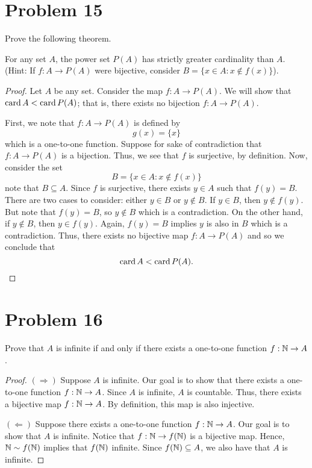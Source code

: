 \documentclass[11pt,a4paper]{article}
\begin{document}
\section*{Problem 15} Prove the following theorem.
\begin{theorem}
    For any set \( A  \), the power set \( P(A) \) has strictly greater cardinality than \( A  \). (Hint: If \( f: A \to P(A) \) were bijective, consider \( B = \{ x \in A : x \notin f(x) \}  \)).
\end{theorem}
\begin{proof}
    Let \( A  \) be any set. Consider the map \( f: A \to P(A) \). We will show that \( \operatorname{card} A < \operatorname{card} P(A) \); that is, there exists no bijection \( f: A \to P(A) \). 

    First, we note that \( f : A \to P(A) \) is defined by  
    \[  g(x) = \{ x \}  \]
    which is a one-to-one function.
    Suppose for sake of contradiction that \( f: A \to P(A) \) is a bijection.  
Thus, we see that \( f  \) is surjective, by definition. Now, consider the set
\[  B = \{ x \in A : x \notin f(x)   \}  \]
note that \( B \subseteq  A  \). Since \( f  \) is surjective, there exists \( y \in A  \) such that \( f(y) = B  \). There are two cases to consider: either \( y \in B  \) or \( y \notin B  \). If \( y \in B  \), then \( y \notin f(y) \). But note that \( f(y) = B  \), so \( y \notin B  \) which is a contradiction. On the other hand, if \( y \notin B   \), then \( y \in f(y) \). Again, \( f(y) = B  \) implies \( y \) is also in \( B  \) which is a contradiction. Thus, there exists no bijective map \( f: A \to P(A) \) and so we conclude that  
\[  \operatorname{card} A < \operatorname{card} P(A). \]
\end{proof}

\section*{Problem 16} Prove that \( A  \) is infinite if and only if there exists a one-to-one function \( f: \mathbb{N} \to A  \). 
\begin{proof}
\( (\Rightarrow) \) Suppose \( A  \) is infinite. Our goal is to show that there exists a one-to-one function \( f: \mathbb{N} \to A  \). Since \( A  \) is infinite, \( A  \) is countable. Thus, there exists a bijective map \( f: \mathbb{N} \to A  \). By definition, this map is also injective.

\( (\Leftarrow) \) Suppose there exists a one-to-one function \( f: \mathbb{N} \to A  \). Our goal is to show that \( A  \) is infinite. Notice that \( f: \mathbb{N} \to f(\mathbb{N}) \) is a bijective map. Hence, \( \mathbb{N} \sim f(\mathbb{N})  \) implies that \( f(\mathbb{N}) \) infinite. Since \( f(\mathbb{N}) \subseteq  A  \), we also have that \( A  \) is infinite.
\end{proof}
\end{document}

